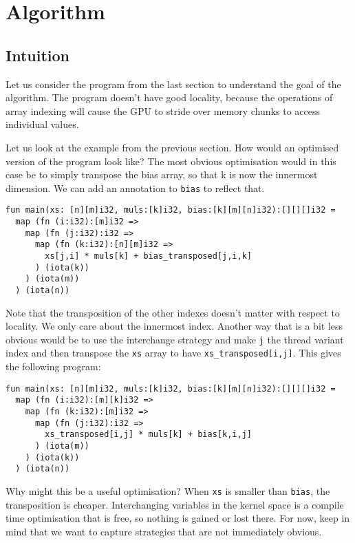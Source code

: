 \documentclass{article}
\begin{document}
\section{Algorithm}

\subsection{Intuition}

Let us consider the program from the last section to understand the goal of the algorithm. The program doesn't have good locality, because the operations of
array indexing will cause the GPU to stride over memory chunks to access individual values.

Let us look at the example from the previous section. How would an optimised version of the program look like? The most obvious optimisation would in this case
be to simply transpose the bias array, so that k is now the innermost dimension. We can add an annotation to \verb`bias` to reflect that.
\begin{verbatim}
fun main(xs: [n][m]i32, muls:[k]i32, bias:[k][m][n]i32):[][][]i32 =
  map (fn (i:i32):[m]i32 =>
    map (fn (j:i32):i32 => 
      map (fn (k:i32):[n][m]i32 =>
        xs[j,i] * muls[k] + bias_transposed[j,i,k]
      ) (iota(k))
    ) (iota(m))
  ) (iota(n))
\end{verbatim}

Note that the transposition of the other indexes doesn't matter with respect to locality. We only care about the innermost index. Another way that is a bit less
obvious would be to use the interchange strategy and make \verb`j` the thread variant index and then transpose the \verb'xs' array to have
\verb`xs_transposed[i,j]`. This gives the following program:

\begin{verbatim}
fun main(xs: [n][m]i32, muls:[k]i32, bias:[k][m][n]i32):[][][]i32 =
  map (fn (i:i32):[m][k]i32 =>
    map (fn (k:i32):[m]i32 => 
      map (fn (j:i32):i32 =>
        xs_transposed[i,j] * muls[k] + bias[k,i,j]
      ) (iota(m))
    ) (iota(k))
  ) (iota(n))
\end{verbatim}

Why might this be a useful optimisation? When \verb`xs` is smaller than \verb`bias`, the transposition is cheaper. Interchanging variables in the kernel space
is a compile time optimisation that is free, so nothing is gained or lost there. For now, keep in mind that we want to capture strategies that are not
immediately obvious.
\end{document}

